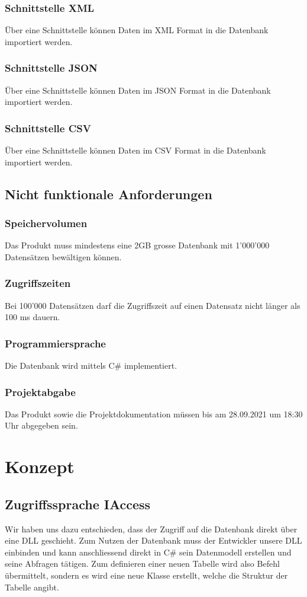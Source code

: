 \documentclass{article}
\begin{document}
\subsubsection{Schnittstelle XML}
Über eine Schnittstelle können Daten im XML Format in die Datenbank importiert werden.
\subsubsection{Schnittstelle JSON}
Über eine Schnittstelle können Daten im JSON Format in die Datenbank importiert werden.
\subsubsection{Schnittstelle CSV}
Über eine Schnittstelle können Daten im CSV Format in die Datenbank importiert werden.
\subsubsection{}
\subsection{Nicht funktionale Anforderungen}
\subsubsection{Speichervolumen}
Das Produkt muss mindestens eine 2GB grosse Datenbank mit 1'000'000 Datensätzen bewältigen können.
\subsubsection{Zugriffszeiten}
Bei 100'000 Datensätzen darf die Zugriffszeit auf einen Datensatz nicht länger als 100 ms dauern.
\subsubsection{Programmiersprache}
Die Datenbank wird mittels C\# implementiert.
\subsubsection{Projektabgabe}
Das Produkt sowie die Projektdokumentation müssen bis am 28.09.2021 um 18:30 Uhr abgegeben sein.
\section{Konzept}
\subsection{Zugriffssprache IAccess}
Wir haben uns dazu entschieden, dass der Zugriff auf die Datenbank direkt über eine DLL geschieht. Zum Nutzen der Datenbank muss der Entwickler unsere DLL einbinden und kann anschliessend direkt in C\# sein Datenmodell erstellen und seine Abfragen tätigen.
 Zum definieren einer neuen Tabelle wird also Befehl übermittelt, sondern es wird eine neue Klasse erstellt, welche die Struktur der Tabelle angibt.
\end{document}
